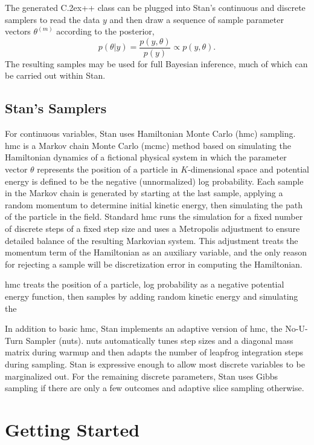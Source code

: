 \documentclass[10pt]{report}
\newcommand{\Stan}{Stan\xspace}
\newcommand*{\Cpp}{C\raise.2ex\hbox{\footnotesize ++}\xspace} %
\newcommand{\acronym}[1]{{\sc #1}\xspace}
\newcommand{\MCMC}{\acronym{mcmc}}
\newcommand{\HMC}{\acronym{hmc}}
\newcommand{\NUTS}{\acronym{nuts}}
\begin{document}
The generated \Cpp class can be plugged into \Stan's continuous and
discrete samplers to read the data $y$ and then draw a sequence of
sample parameter vectors $\theta^{(m)}$ according to the posterior,
\[
p(\theta|y) = \frac{p(y,\theta)}{p(y)} \propto p(y,\theta).
\]
The resulting samples may be used for full Bayesian inference, much of
which can be carried out within \Stan.

\section{\Stan's Samplers}

For continuous variables, \Stan uses Hamiltonian Monte Carlo (\HMC)
sampling. \HMC is a Markov chain Monte Carlo (\MCMC) method based on
simulating the Hamiltonian dynamics of a fictional physical system in
which the parameter vector $\theta$ represents the position of a
particle in $K$-dimensional space and potential energy is defined to
be the negative (unnormalized) log probability.  Each sample in the
Markov chain is generated by starting at the last sample, applying a
random momentum to determine initial kinetic energy, then simulating
the path of the particle in the field.  Standard \HMC runs the
simulation for a fixed number of discrete steps of a fixed step size
and uses a Metropolis adjustment to ensure detailed balance of the
resulting Markovian system.  This adjustment treats the momentum term
of the Hamiltonian as an auxiliary variable, and the only reason for
rejecting a sample will be discretization error in computing the
Hamiltonian.

\HMC treats the position of a particle, 
log probability as a negative potential
energy function, then samples by adding random kinetic energy and
simulating the 

In addition to basic \HMC, \Stan implements an adaptive
version of \HMC, the No-U-Turn Sampler (\NUTS).  \NUTS automatically
tunes step sizes and a diagonal mass matrix during warmup and then
adapts the number of leapfrog integration steps during sampling.
Stan is expressive enough to allow most discrete variables to be
marginalized out.  For the remaining discrete parameters, \Stan uses
Gibbs sampling if there are only a few outcomes and adaptive slice
sampling otherwise.


\chapter{Getting Started}
\end{document}
